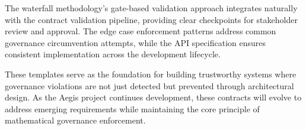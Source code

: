 \documentclass[11pt,letterpaper]{article}
\begin{document}
The waterfall methodology's gate-based validation approach integrates naturally with the contract validation pipeline, providing clear checkpoints for stakeholder review and approval. The edge case enforcement patterns address common governance circumvention attempts, while the API specification ensures consistent implementation across the development lifecycle.

These templates serve as the foundation for building trustworthy systems where governance violations are not just detected but prevented through architectural design. As the Aegis project continues development, these contracts will evolve to address emerging requirements while maintaining the core principle of mathematical governance enforcement.
\end{document}
